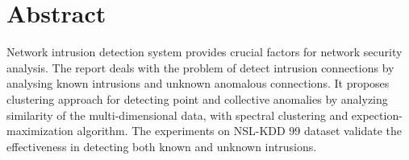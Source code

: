 \section{Abstract}
Network intrusion detection system provides crucial factors for network security analysis.
The report deals with the problem of detect intrusion connections by analysing known intrusions and unknown anomalous connections.
It proposes clustering approach for detecting point and collective anomalies by analyzing similarity of the multi-dimensional data, with spectral clustering and expection-maximization algorithm.
The experiments on NSL-KDD 99 dataset validate the effectiveness in detecting both known and unknown intrusions.
